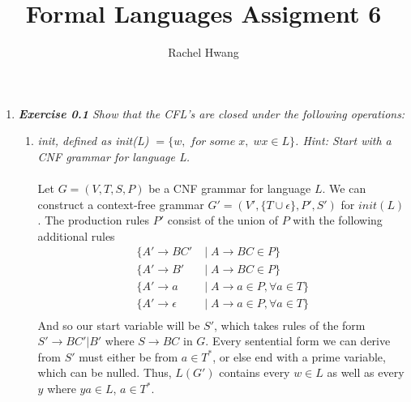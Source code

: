 \documentclass[a4paper]{article}
\title{Formal Languages Assigment 6}
\author{Rachel Hwang}
\begin{document}
\maketitle

\begin{enumerate}

\item \emph{\textbf{Exercise 0.1} Show that the CFL's are closed under the following operations:} \\
\begin{enumerate}[1.]
\item \emph{init, defined as init(L) $= \{w,\; for\;some\;x, \; wx \in L\}$. Hint: Start with a CNF grammar for language L.} \\
\\
Let $G = (V, T, S, P)$ be a CNF grammar for language $L$. We can construct a context-free grammar $G' = (V',\{T \cup \epsilon\},P', S')$ for $init(L)$. The production rules $P'$ consist of the union of $P$ with the following additional rules
\begin{align*}
\{A' \to BC'\; &| \;A \to BC \in P\} \\
\{A' \to B'\; &| \;A \to BC \in P\} \\
\{A' \to a\; &| \;A \to a \in P, \forall a \in T\} \\
\{A' \to \epsilon\; &|\;A \to a \in P, \forall a \in T\} \\
\end{align*}
And so our start variable will be $S'$, which takes rules of the form $S'\to BC'|B'$ where $S\to BC$ in $G$. Every sentential form we can derive from $S'$ must either be from $a \in T^\ast$, or else end with a prime variable, which can be nulled. Thus, $L(G')$ contains every $w \in L$ as well as every $y$ where $ya \in L$, $a \in T^\ast$. \\
\\




\end{enumerate}
\end{enumerate}
\end{document}

